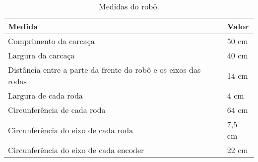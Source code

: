 \documentclass[oneside,a4paper,12pt]{normas-utf-tex}
\renewcommand{\toprule}{\midrule[\heavyrulewidth]}
\begin{document}

\begin{table}[H]
  \caption{Medidas do robô.}
  \centering
  \begin{tabular}{l|l}
    \toprule
    \textbf{Medida} & \textbf{Valor} \\
    \midrule
    Comprimento da carcaça & 50 cm \\ \hline
    Largura da carcaça & 40 cm \\ \hline
    Distância entre a parte da frente do robô e os eixos das rodas & 14 cm \\ \hline
    Largura de cada roda & 4 cm \\ \hline
    Circunferência de cada roda & 64 cm \\ \hline
    Circunferência do eixo de cada roda & 7,5 cm \\ \hline
    Circunferência do eixo de cada encoder & 22 cm \\ 
    \bottomrule
  \end{tabular}
  \label{tab:medidas_robo}
\end{table}


\raggedright

\end{document}
